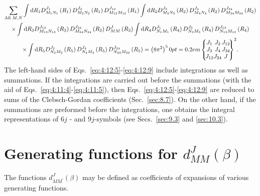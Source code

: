 \begin{multline}
 \sum_{\text {All } M, N} \int \dd R_{1} D_{M_{1} N_{1}}^{J_{1}}\left(R_{1}\right) D_{M_{2} N_{2}}^{J_{2}}\left(R_{1}\right) D_{M_{12} M_{12}}^{J_{12}}\left(R_{1}\right) \int \dd R_{2} D_{M_{3} N_{3}}^{J_{3}}\left(R_{2}\right) D_{M_{4} N_{4}}^{J_{4}}\left(R_{2}\right) D_{M_{34} M_{34}}^{J_{34}}\left(R_{2}\right)  \notag\\
 \times \int \dd R_{3} D_{M_{13} N_{13}}^{J_{13}}\left(R_{3}\right) D_{M_{24} N_{24}}^{J_{24}}\left(R_{3}\right) D_{M M}^{J}\left(R_{3}\right) \int \dd R_{4} D_{N_{1} M_{1}}^{J_{1}}\left(R_{4}\right) D_{N_{3} M_{3}}^{J_{3}}\left(R_{4}\right) D_{N_{13} M_{13}}^{J_{13}}\left(R_{4}\right)  \\
 \times \int \dd R_{5} D_{N_{2} M_{2}}^{J_{2}}\left(R_{5}\right) D_{N_{4} M_{4}}^{J_{4}}\left(R_{5}\right) D_{N_{24} M_{24}}^{J_{24}}\left(R_{5}\right)=\left(8 \pi^{2}\right)^{5}
 \ninej{J_{1}}{J_{2}}{J_{12}}{J_{3}}{J_{4}}{J_{34}}{J_{13}}{J_{24}}{J}^2
 . \label{eq:4:12:9}
\end{multline}
The left-hand sides of Eqs.~\eqref{eq:4:12:5}-\eqref{eq:4:12:9} include integrations as well as summations. If the integrations are carried out before the summations (with the aid of Eqs.~\eqref{eq:4:11:4}-\eqref{eq:4:11:5}), then Eqs.~\eqref{eq:4:12:5}-\eqref{eq:4:12:9} are reduced to sums of the Clebsch-Gordan coefficients (Sec.~\ref{sec:8.7}). On the other hand, if the summations are preformed before the integrations, one obtains the integral representations of $6 j$ - and $9 j$-symbols (see Secs.~\ref{sec:9.3} and \ref{sec:10.3}).

\section{Generating functions for $d_{M M}^{J}(\beta)$}\label{sec:4.13}
The functions $d_{M M^{\prime}}^{J}(\beta)$ may be defined as coefficients of expansions of various generating functions.
